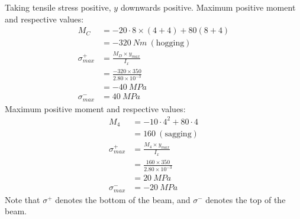 \documentclass{article}
\begin{document}
Taking tensile stress positive, $y$ downwards positive.
Maximum positive moment and respective values:
\begin{align*}
    M_C            & = -20\cdot8\times(4+4)+80(8+4)             \\
                   & = -320\ Nm\ (\text{hogging})               \\
    \sigma^+_{max} & = \frac{M_D\times y_{max}}{I_x}            \\
                   & = \frac{-320\times 350}{2.80\times10^{-3}} \\
                   & = -40\ MPa                                 \\
    \sigma^-_{max} & = 40\ MPa
\end{align*}
Maximum positive moment and respective values:
\begin{align*}
    M_{4}          & = -10\cdot4^2+80\cdot4                    \\
                   & = 160\ (\text{sagging})                   \\
    \sigma^+_{max} & = \frac{M_{4}\times y_{max}}{I_x}         \\
                   & = \frac{160\times 350}{2.80\times10^{-3}} \\
                   & = 20\ MPa                                 \\
    \sigma^-_{max} & = -20\ MPa
\end{align*}
Note that $\sigma^+$ denotes the bottom of the beam, and $\sigma^-$ denotes the top of the beam.
\end{document}
